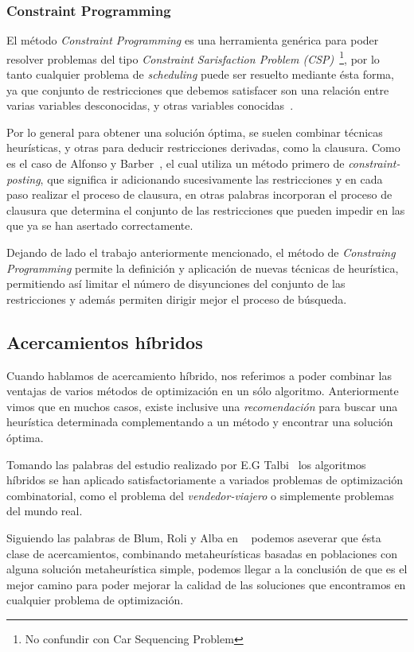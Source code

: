 \subsubsection{Constraint Programming}

El método \emph{Constraint Programming} es una herramienta genérica para poder resolver problemas
del tipo \emph{Constraint  Sarisfaction Problem (CSP)}~\footnote{No confundir con Car Sequencing Problem},
por lo tanto cualquier problema de \emph{scheduling} puede ser resuelto mediante ésta forma,
ya que conjunto de restricciones que debemos satisfacer son una relación entre varias variables desconocidas,
y otras variables conocidas~\cite{Tsa93}.

%
Por lo general para obtener una solución óptima, se suelen combinar técnicas heurísticas,
y otras para deducir restricciones derivadas, como la clausura.
Como es el caso de Alfonso y Barber~\cite{esp1}, el cual utiliza un método primero de \emph{constraint-posting},
que significa ir adicionando sucesivamente las restricciones y en cada paso realizar el proceso de clausura,
en otras palabras incorporan el proceso de clausura que determina el conjunto de las restricciones que pueden
impedir  en las que ya se han asertado correctamente.

Dejando de lado el trabajo anteriormente mencionado, el método de \emph{Constraing Programming} permite la definición
y aplicación de nuevas técnicas de heurística, permitiendo así limitar el número de disyunciones
del conjunto de las restricciones y además permiten dirigir mejor el proceso de búsqueda.

\subsection{Acercamientos híbridos}

Cuando hablamos de acercamiento híbrido, nos referimos a poder combinar las ventajas de varios
métodos de optimización en un sólo algoritmo.
Anteriormente vimos que en muchos casos, existe inclusive una \emph{recomendación} para buscar
una heurística determinada complementando a un método y encontrar una solución óptima.


Tomando las palabras del estudio realizado por E.G Talbi~\cite{talbi} los algoritmos híbridos
se han aplicado satisfactoriamente a variados problemas de optimización combinatorial, como el problema
del \emph{vendedor-viajero} o simplemente problemas del mundo real.


Siguiendo las palabras de Blum, Roli y Alba en ~\cite{blum} podemos aseverar que ésta clase de acercamientos,
combinando metaheurísticas basadas en  poblaciones con alguna solución metaheurística simple, podemos llegar
a la conclusión de que es el mejor camino para poder mejorar la calidad de las soluciones que encontramos
en cualquier problema de optimización.

